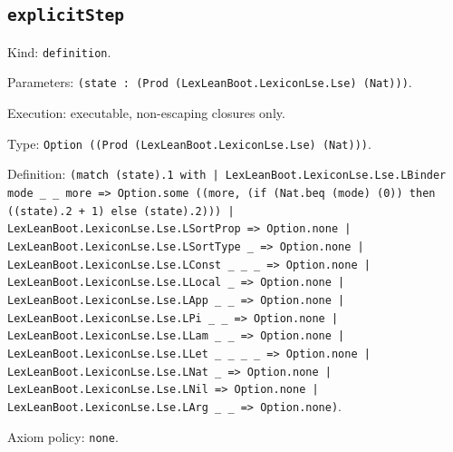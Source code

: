 \documentclass[11pt]{article}
\begin{document}
\subsection*{\texttt{explicitStep}}
\noindent Kind: \texttt{definition}.\par
\noindent Parameters: \texttt{(state : (Prod (LexLeanBoot.LexiconLse.Lse) (Nat)))}.\par
\noindent Execution: executable, non-escaping closures only.\par
\noindent Type: \texttt{Option ((Prod (LexLeanBoot.LexiconLse.Lse) (Nat)))}.\par
\noindent Definition: \texttt{(match (state).1 with | LexLeanBoot.LexiconLse.Lse.LBinder mode \_ \_ more => Option.some ((more, (if (Nat.beq (mode) (0)) then ((state).2 + 1) else (state).2))) | LexLeanBoot.LexiconLse.Lse.LSortProp => Option.none | LexLeanBoot.LexiconLse.Lse.LSortType \_ => Option.none | LexLeanBoot.LexiconLse.Lse.LConst \_ \_ \_ => Option.none | LexLeanBoot.LexiconLse.Lse.LLocal \_ => Option.none | LexLeanBoot.LexiconLse.Lse.LApp \_ \_ => Option.none | LexLeanBoot.LexiconLse.Lse.LPi \_ \_ => Option.none | LexLeanBoot.LexiconLse.Lse.LLam \_ \_ => Option.none | LexLeanBoot.LexiconLse.Lse.LLet \_ \_ \_ \_ => Option.none | LexLeanBoot.LexiconLse.Lse.LNat \_ => Option.none | LexLeanBoot.LexiconLse.Lse.LNil => Option.none | LexLeanBoot.LexiconLse.Lse.LArg \_ \_ => Option.none)}.\par
\noindent Axiom policy: \texttt{none}.\par
\end{document}
